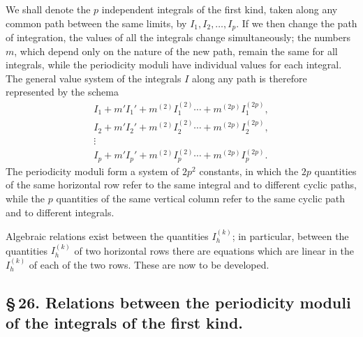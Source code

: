 \documentclass[10pt]{article}
\begin{document}
We shall denote the \(p\) independent integrals of the first kind, taken along any common path between the same limits, by \(I_1,I_2,\ldots,I_p\). If we then change the path of integration, the values of all the integrals change simultaneously; the numbers \(m\), which depend only on the nature of the new path, remain the same for all integrals, while the periodicity moduli have individual values for each integral. The general value system of the integrals \(I\) along any path is therefore represented by the schema
\[
\begin{gathered}
I_1+m'I_1'+m^{(2)}I_1^{(2)}\cdots+m^{(2p)}I_1^{(2p)},\\
I_2+m'I_2'+m^{(2)}I_2^{(2)}\cdots+m^{(2p)}I_2^{(2p)},\\
\vdots\\
I_p+m'I_p'+m^{(2)}I_p^{(2)}\cdots+m^{(2p)}I_p^{(2p)}.
\end{gathered}
\]
The periodicity moduli form a system of \(2p^2\) constants, in which the \(2p\) quantities of the same horizontal row refer to the same integral and to different cyclic paths, while the \(p\) quantities of the same vertical column refer to the same cyclic path and to different integrals.

Algebraic relations exist between the quantities \(I_h^{(k)}\); in particular, between the quantities \(I_h^{(k)}\) of two horizontal rows there are equations which are linear in the \(I_h^{(k)}\) of each of the two rows. These are now to be developed.

\subsection*{\S\,26. Relations between the periodicity moduli of the integrals of the first kind.\footnotemark}
\end{document}
